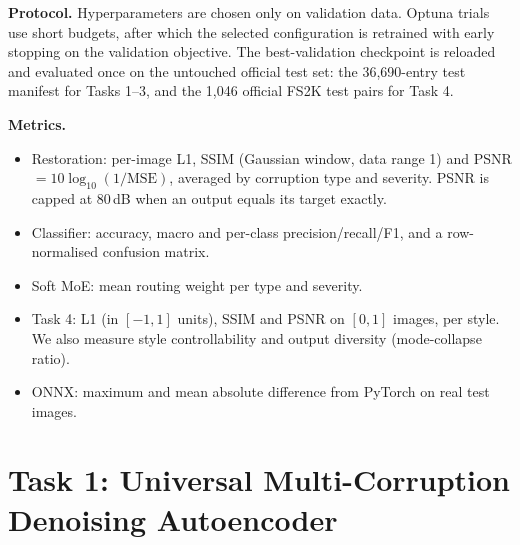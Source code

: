 \documentclass[conference]{IEEEtran}
\begin{document}
\textbf{Protocol.} Hyperparameters are chosen only on validation data. Optuna trials use short budgets, after which the selected configuration is retrained with early stopping on the validation objective. The best-validation checkpoint is reloaded and evaluated once on the untouched official test set: the 36{,}690-entry test manifest for Tasks 1--3, and the 1{,}046 official FS2K test pairs for Task 4.

\textbf{Metrics.}
\begin{itemize}
\item Restoration: per-image L1, SSIM (Gaussian window, data range 1) and PSNR $=10\log_{10}(1/\mathrm{MSE})$, averaged by corruption type and severity. PSNR is capped at 80\,dB when an output equals its target exactly.
\item Classifier: accuracy, macro and per-class precision/recall/F1, and a row-normalised confusion matrix.
\item Soft MoE: mean routing weight per type and severity.
\item Task 4: L1 (in $[-1,1]$ units), SSIM and PSNR on $[0,1]$ images, per style. We also measure style controllability and output diversity (mode-collapse ratio).
\item ONNX: maximum and mean absolute difference from PyTorch on real test images.
\end{itemize}

\section{Task 1: Universal Multi-Corruption Denoising Autoencoder}\label{sec:t1}
\end{document}
